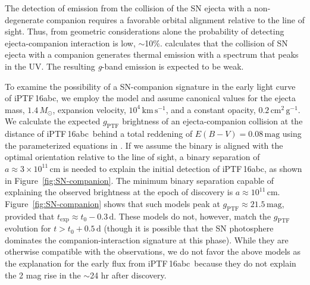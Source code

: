 \documentclass[twocolumn]{aastex61}
\newcommand{\sm}{M_\odot}
\newcommand{\abc}{iPTF\,16abc}
\begin{document}
The detection of emission from the collision of the SN ejecta 
with a non-degenerate companion requires a favorable orbital 
alignment relative to the line of sight. Thus, from geometric 
considerations alone the probability of detecting ejecta-companion 
interaction is low, $\sim$10\%. \citet{2010ApJ...708.1025K} 
calculates that the collision of SN ejecta with a companion  
generates thermal emission with a spectrum that peaks in the 
UV. The resulting \textit{g}-band emission is expected to be weak.

To examine the possibility of a SN-companion signature in the early
light curve of \abc, we employ the \citet{2010ApJ...708.1025K}
model and assume canonical values for the ejecta mass, $1.4\,\sm$, expansion velocity, $10^{4}\,\textrm{km}\,\textrm{s}^{-1}$, and a constant opacity, $0.2\,\textrm{cm}^2\,\textrm{g}^{-1}$. We calculate the expected $g_\mathrm{PTF}$ brightness of an ejecta-companion collision at the distance of \abc\ behind a total reddening of $E(B-V) = 0.08 \, \mathrm{mag}$ using the parameterized equations in \citet{2012ApJ...749...18B}. If we assume the binary is aligned with the optimal orientation relative to the line of sight, a binary separation of $a \approx 3 \times 10^{11}\, \mathrm{cm}$ is needed to explain the initial detection of \abc, as shown in Figure~\ref{fig:SN-companion}.  The minimum binary separation capable of explaining the observed brightness at the epoch of discovery is $a \approx 10^{11} \, \mathrm{cm}$. Figure~\ref{fig:SN-companion} shows that such models peak at $g_\mathrm{PTF} \approx 21.5 \, \mathrm{mag}$, provided that $t_\mathrm{exp} \approx t_0 - 0.3 \, \mathrm{d}$. These models do not, however, match the $g_\mathrm{PTF}$ evolution for $t > t_0 + 0.5 \, \mathrm{d}$ (though it is possible that the SN photosphere dominates the companion-interaction signature at this phase). While they are otherwise compatible with the observations, we do not favor the above models as the explanation for the early flux from \abc\ because they do not explain the 2 mag rise in the $\sim$24 hr after discovery.
\end{document}
